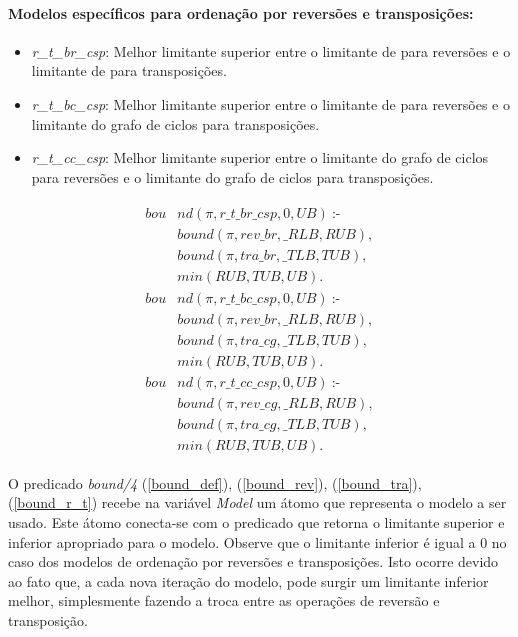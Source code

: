 \paragraph{Modelos específicos para ordenação por reversões e transposições:} 
\begin{itemize}

    \item{\textit{r\_t\_br\_csp}: Melhor limitante superior entre o
        limitante de \bkp{} para reversões e o limitante de \bkp{} para
        transposições.}

    \item{\textit{r\_t\_bc\_csp}: Melhor limitante superior entre o
        limitante de \bkp{} para reversões e o limitante do grafo de
        ciclos para transposições.}

    \item{\textit{r\_t\_cc\_csp}: Melhor limitante superior entre o
        limitante do grafo de ciclos para reversões e o limitante do grafo
        de ciclos para transposições.}

\end{itemize}
\begin{align}
  \label{bound_r_t}
  \begin{split}
  \textit{bou}&\textit{nd}(\pi, r\_t\_br\_csp, 0, UB)~\text{:-} \\
  &\textit{bound}(\pi, rev\_br, \_RLB, RUB), \\
  &\textit{bound}(\pi, tra\_br, \_TLB, TUB), \\
  &\textit{min}(RUB, TUB, UB). \\
  \textit{bou}&\textit{nd}(\pi, r\_t\_bc\_csp, 0, UB)~\text{:-} \\
  &\textit{bound}(\pi, rev\_br, \_RLB, RUB), \\
  &\textit{bound}(\pi, tra\_cg, \_TLB, TUB), \\
  &\textit{min}(RUB, TUB, UB). \\
  \textit{bou}&\textit{nd}(\pi, r\_t\_cc\_csp, 0, UB)~\text{:-} \\
  &\textit{bound}(\pi, rev\_cg, \_RLB, RUB), \\
  &\textit{bound}(\pi, tra\_cg, \_TLB, TUB), \\
  &\textit{min}(RUB, TUB, UB).
  \end{split}
\end{align}

O predicado \textit{bound/4} (\ref{bound_def}), (\ref{bound_rev}),
(\ref{bound_tra}), (\ref{bound_r_t}) recebe na variável \textit{Model}
um átomo que representa o modelo a ser usado. Este átomo conecta-se com
o predicado que retorna o limitante superior e inferior apropriado para
o modelo. Observe que o limitante inferior é igual a $0$ no caso dos
modelos de ordenação por reversões e transposições. Isto ocorre devido
ao fato que, a cada nova iteração do modelo, pode surgir um limitante
inferior melhor, simplesmente fazendo a troca entre as operações de
reversão e transposição.

